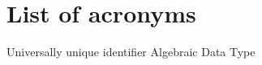 \chapter{List of acronyms}

{\small
\begin{acronym}[XXXXXXXX]
       {Universally unique identifier}
       {Algebraic Data Type}
\end{acronym}
}
